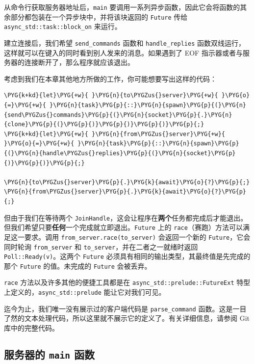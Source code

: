 从命令行获取服务器地址后，\texttt{main} 要调用一系列异步函数，因此它会将函数的其余部分都包装在一个异步块中，并将该块返回的 \texttt{Future} 传给 \texttt{async\_std::task::block\_on} 来运行。

建立连接后，我们希望 \texttt{send\_commands} 函数和 \texttt{handle\_replies} 函数双线运行，这样就可以在键入的同时看到别人发来的消息。如果遇到了 EOF 指示器或者与服务器的连接断开了，那么程序就应该退出。

考虑到我们在本章其他地方所做的工作，你可能想要写出这样的代码：

\begin{Verbatim}[commandchars=\\\{\},breaklines=true,breakanywhere=true,fontsize=\codefont,xleftmargin=17bp]
\PYG{k+kd}{let}\PYG{+w}{ }\PYG{n}{to\PYGZus{}server}\PYG{+w}{ }\PYG{o}{=}\PYG{+w}{ }\PYG{n}{task}\PYG{p}{::}\PYG{n}{spawn}\PYG{p}{(}\PYG{n}{send\PYGZus{}commands}\PYG{p}{(}\PYG{n}{socket}\PYG{p}{.}\PYG{n}{clone}\PYG{p}{(}\PYG{p}{)}\PYG{p}{)}\PYG{p}{)}\PYG{p}{;}
\PYG{k+kd}{let}\PYG{+w}{ }\PYG{n}{from\PYGZus{}server}\PYG{+w}{ }\PYG{o}{=}\PYG{+w}{ }\PYG{n}{task}\PYG{p}{::}\PYG{n}{spawn}\PYG{p}{(}\PYG{n}{handle\PYGZus{}replies}\PYG{p}{(}\PYG{n}{socket}\PYG{p}{)}\PYG{p}{)}\PYG{p}{;}

\PYG{n}{to\PYGZus{}server}\PYG{p}{.}\PYG{k}{await}\PYG{o}{?}\PYG{p}{;}
\PYG{n}{from\PYGZus{}server}\PYG{p}{.}\PYG{k}{await}\PYG{o}{?}\PYG{p}{;}
\end{Verbatim}

但由于我们在等待两个 \texttt{JoinHandle}，这会让程序在\textbf{两个}任务都完成后才能退出。但我们希望只要\textbf{任何}一个完成就立即退出。\texttt{Future} 上的 \texttt{race}（赛跑）方法可以满足这一要求。调用 \texttt{from\_server.race(to\_server)} 会返回一个新的 \texttt{Future}，它会同时轮询 \texttt{from\_server} 和 \texttt{to\_server}，并在二者之一就绪时返回 \texttt{Poll::Ready(v)}。这两个 \texttt{Future} 必须具有相同的输出类型，其最终值是先完成的那个 \texttt{Future} 的值。未完成的 \texttt{Future} 会被丢弃。

\texttt{race} 方法以及许多其他的便捷工具都是在 \texttt{async\_std::prelude::FutureExt} 特型上定义的，\texttt{async\_std::prelude} 能让它对我们可见。

迄今为止，我们唯一没有展示过的客户端代码是 \texttt{parse\_command} 函数。这是一目了然的文本处理代码，所以这里就不展示它的定义了。有关详细信息，请参阅 Git 库中的完整代码。

\subsection{服务器的 \texttt{main} 函数}

